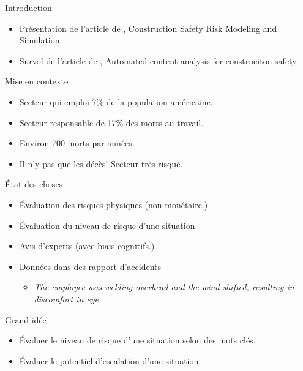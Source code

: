

\begin{frame}[label=intro]{Introduction}
	\begin{itemize}
		\item Présentation de l'article de \cite{tixier2017construction}, Construction Safety Risk Modeling and Simulation.
		\item Survol de l'article de \cite{tixierNLP}, Automated content analysis for construciton safety.	
		
	\end{itemize}
	\end{frame}


\begin{frame}[label=intro]{Mise en contexte}
	\begin{itemize}
		\item Secteur qui emploi 7\% de la population américaine.
		\item Secteur responsable de 17\% des morts au travail.
		\item Environ 700 morts par années.
		\item Il n'y pas que les décès! Secteur très risqué.
	\end{itemize}
	\end{frame}


\begin{frame}[label=intro]{État des choses}
	\begin{itemize}
			\item Évaluation des risques physiques (non monétaire.)
		\item Évaluation du niveau de risque d'une situation.
		\item Avis d'experts (avec biais cognitifs.)
		\item Données dans des rapport d'accidents	
			\begin{itemize}
				\item \textit{The employee was welding overhead and the wind shifted, resulting in discomfort in eye.}
			\end{itemize}
				
	\end{itemize}
\end{frame}


\begin{frame}[label=intro]{Grand idée}
	\begin{itemize}
		\item Évaluer le niveau de risque d'une situation selon des mots clés.
		\item Évaluer le potentiel d'escalation d'une situation.
	\end{itemize}
\end{frame}


